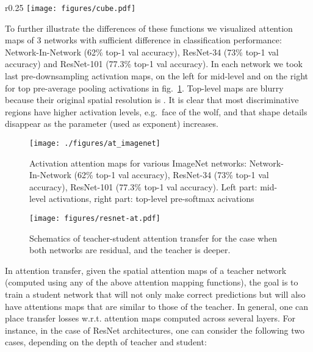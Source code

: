 \documentclass{article} \usepackage{iclr2017_conference}
\begin{document}
\begin{wrapfigure}{r}{0.25\textwidth}
  \centering
  \texttt{[image: figures/cube.pdf]}
  \caption{Attention mapping over feature dimension.}
  \label{fig:cube}
\end{wrapfigure}


To further illustrate the differences of these functions we visualized attention maps of 3 networks with sufficient difference in classification performance: Network-In-Network (62\% top-1 val accuracy), ResNet-34 (73\% top-1 val accuracy) and ResNet-101 (77.3\% top-1 val accuracy). In each network we took last pre-downsampling activation maps, on the left for mid-level and on the right for top pre-average pooling activations in fig.~\ref{figure:imagenet_sumabs_maps}. Top-level maps are blurry because their original spatial resolution is . It is clear that most discriminative regions have higher activation levels, e.g.\ face of the wolf, and that shape details disappear as the parameter  (used as  exponent) increases.

\begin{figure}
  \hspace{-0.55cm}
  \centering
  \texttt{[image: ./figures/at\_imagenet]}
  \caption{Activation attention maps for various ImageNet networks: Network-In-Network (62\% top-1 val accuracy), ResNet-34 (73\% top-1 val accuracy), ResNet-101 (77.3\% top-1 val accuracy). Left part: mid-level activations, right part: top-level pre-softmax acivations}
  \label{figure:imagenet_sumabs_maps}
\end{figure}



\begin{figure}[ht]
  \centering
  \texttt{[image: figures/resnet-at.pdf]}
  \caption{Schematics of teacher-student attention transfer for the case when both networks are residual, and the teacher is deeper.}
  \label{fig:resnet_attention_schematics}
\end{figure}

In attention transfer,   given the spatial attention maps of a teacher network (computed  using any of the above attention mapping functions), the goal  is to train a student network  that will not only make correct predictions but will also have   attentions maps that are similar to those of the teacher. In general, one can place  transfer losses w.r.t. attention maps computed across
several layers.
 For instance, in the case of ResNet architectures,
one can consider the following two cases, depending on the depth of teacher and student:
\end{document}
